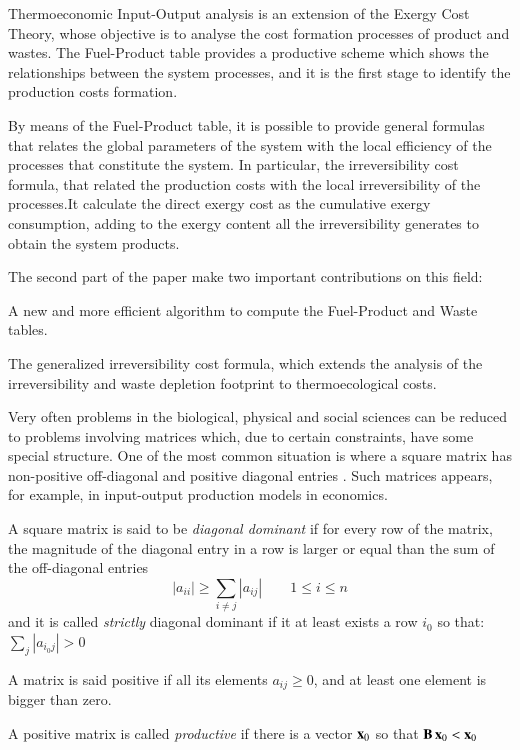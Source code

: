 \documentclass{ecos2018}
\begin{document}
Thermoeconomic Input-Output analysis is an extension of the Exergy Cost Theory, whose objective is to analyse the cost formation processes of product and wastes. The Fuel-Product table provides a productive scheme which shows the relationships between the system processes, and it is the first stage to identify the production costs formation.

By means of the Fuel-Product table, it is possible to provide general formulas that relates the global parameters of the system with the local efficiency of the processes that constitute the system. In particular, the irreversibility cost formula, that related the production costs with the local irreversibility of the processes.It calculate the direct exergy cost as the cumulative exergy consumption, adding to the exergy content all the irreversibility generates to obtain the system products. 

The second part of the paper make two important contributions on this field:
\begin{elist}
	\item A new and more efficient algorithm to compute the Fuel-Product and Waste tables.
	\item The generalized irreversibility cost formula, which extends the analysis of the irreversibility and waste depletion footprint to thermoecological costs.   
\end{elist}

\apendice
Very often problems in the biological, physical and social sciences can be reduced to problems involving matrices which, due to certain constraints, have some special structure. One of the most common situation is where a square matrix has non-positive off-diagonal and positive diagonal entries \cite{Plemmons74}. Such matrices appears, for example, in input-output production models in economics.

A square matrix  is said to be \emph{diagonal dominant} if for every row of the matrix, the magnitude of the diagonal entry in a row is larger or equal than the sum of the off-diagonal entries
\[ \left|a_{ii}\right| \geq \sum_{i \neq j} {\left|a_{ij}\right|}
\qquad 1 \leq i \leq n \]
and it is called \emph{strictly} diagonal dominant if it at least exists a row $i_0$
so that: $\sum_{j}{\left| a_{i_0 j} \right|} > 0$

A matrix  is said positive if all its elements $a_{ij}\ge0$, and at least one element is bigger than zero. 

A positive matrix  is called \emph{productive} \cite{Gale89} if there is a vector $\mathbf{x}_0$ so that
$\mathbf{B}\,\mathbf{x}_0 < \mathbf{x}_0$
\end{document}
